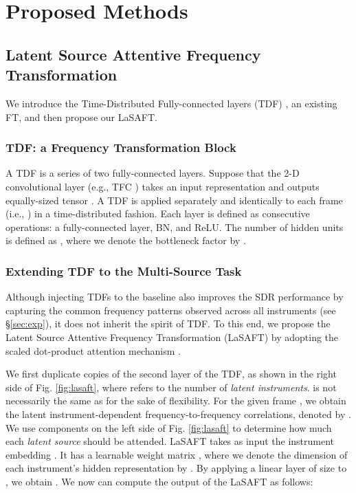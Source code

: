 \documentclass{article}
\begin{document}
\section{Proposed Methods}

\subsection{Latent Source Attentive Frequency Transformation}

We introduce the Time-Distributed Fully-connected layers (TDF) \cite{tfctdf}, an existing FT, and then propose our LaSAFT.

\subsubsection{TDF: a Frequency Transformation Block}

A TDF is a series of two fully-connected layers.
Suppose that the 2-D convolutional layer (e.g., TFC \cite{tfctdf}) takes an input representation  and outputs equally-sized tensor .
A TDF is applied separately and identically to each frame (i.e., ) in a time-distributed fashion. 
Each layer is defined as consecutive operations: a fully-connected layer, BN, and ReLU. 
The number of hidden units is defined as , where we denote the bottleneck factor by . 

\subsubsection{Extending TDF to the Multi-Source Task}

Although injecting TDFs to the baseline also improves the SDR performance by capturing the common frequency patterns observed across all instruments (see \S \ref{sec:exp}), it does not inherit the spirit of TDF. To this end, we propose the Latent Source Attentive Frequency Transformation (LaSAFT) by adopting the scaled dot-product attention mechanism \cite{transformer}.


We first duplicate  copies of the second layer of the TDF, as shown in the right side of Fig. \ref{fig:lasaft}, where  refers to the number of \textit{latent instruments}.  is not necessarily the same as  for the sake of flexibility.
For the given frame , we obtain the  latent instrument-dependent frequency-to-frequency correlations, denoted by .
We use components on the left side of Fig. \ref{fig:lasaft} to determine how much each \textit{latent source} should be attended. LaSAFT takes as input  the instrument embedding . 
It has a learnable weight matrix , where we denote the dimension of each instrument's hidden representation by .
By applying a linear layer of size  to , we obtain .
We now can compute the output of the LaSAFT as follows:
\end{document}
